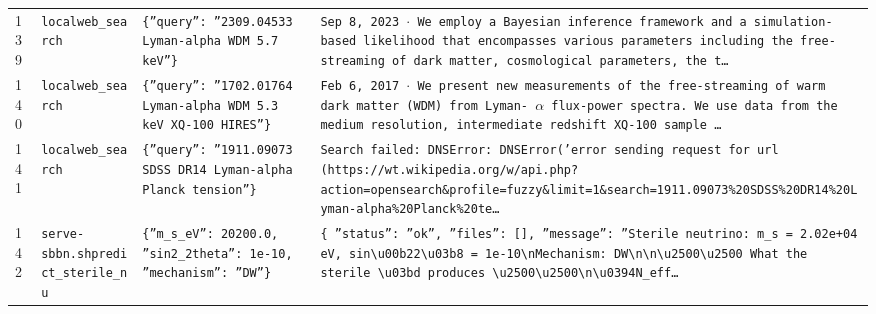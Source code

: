 \documentclass[11pt,a4paper]{article}
\begin{document}
\begin{longtable}{@{}p{}p{}p{}p{}@{}}
139 & \texttt{local}\newline\texttt{web\_\allowbreak{}search} & \texttt{\{''query'':\allowbreak{} ''2309.04533 Lyman-alpha WDM 5.7 keV''\}\allowbreak{}} & \texttt{Sep 8,\allowbreak{} 2023 $\cdot$ We employ a Bayesian inference framework and a simulation-based likelihood that encompasses various parameters including the free-streaming of dark matter,\allowbreak{} cosmological parameters,\allowbreak{} the t\ldots{}\allowbreak{}} \\
140 & \texttt{local}\newline\texttt{web\_\allowbreak{}search} & \texttt{\{''query'':\allowbreak{} ''1702.01764 Lyman-alpha WDM 5.3 keV XQ-100 HIRES''\}\allowbreak{}} & \texttt{Feb 6,\allowbreak{} 2017 $\cdot$ We present new measurements of the free-streaming of warm dark matter (WDM)\allowbreak{} from Lyman- $\alpha$ flux-power spectra. We use data from the medium resolution,\allowbreak{} intermediate redshift XQ-100 sample \ldots{}\allowbreak{}} \\
141 & \texttt{local}\newline\texttt{web\_\allowbreak{}search} & \texttt{\{''query'':\allowbreak{} ''1911.09073 SDSS DR14 Lyman-alpha Planck tension''\}\allowbreak{}} & \texttt{Search failed:\allowbreak{} DNSError:\allowbreak{} DNSError('error sending request for url (https:\allowbreak{}/\allowbreak{}/\allowbreak{}wt.wikipedia.org/\allowbreak{}w/\allowbreak{}api.php?action=\allowbreak{}opensearch\&profile=\allowbreak{}fuzzy\&limit=\allowbreak{}1\&search=\allowbreak{}1911.09073\%20SDSS\%20DR14\%20Lyman-alpha\%20Planck\%20te\ldots{}\allowbreak{}} \\
142 & \texttt{serve-sbbn.sh}\newline\texttt{predict\_\allowbreak{}sterile\_\allowbreak{}nu} & \texttt{\{''m\_\allowbreak{}s\_\allowbreak{}eV'':\allowbreak{} 20200.0,\allowbreak{} ''sin2\_\allowbreak{}2theta'':\allowbreak{} 1e-10,\allowbreak{} ''mechanism'':\allowbreak{} ''DW''\}\allowbreak{}} & \texttt{\{   ''status'':\allowbreak{} ''ok'',\allowbreak{}   ''files'':\allowbreak{} []\allowbreak{},\allowbreak{}   ''message'':\allowbreak{} ''Sterile neutrino:\allowbreak{} m\_\allowbreak{}s =\allowbreak{} 2.02e+04 eV,\allowbreak{} sin\textbackslash{}\allowbreak{}u00b22\textbackslash{}\allowbreak{}u03b8 =\allowbreak{} 1e-10\textbackslash{}\allowbreak{}nMechanism:\allowbreak{} DW\textbackslash{}\allowbreak{}n\textbackslash{}\allowbreak{}n\textbackslash{}\allowbreak{}u2500\textbackslash{}\allowbreak{}u2500 What the sterile \textbackslash{}\allowbreak{}u03bd produces \textbackslash{}\allowbreak{}u2500\textbackslash{}\allowbreak{}u2500\textbackslash{}\allowbreak{}n\textbackslash{}\allowbreak{}u0394N\_\allowbreak{}eff\ldots{}\allowbreak{}} \\

\end{longtable}
\end{document}
